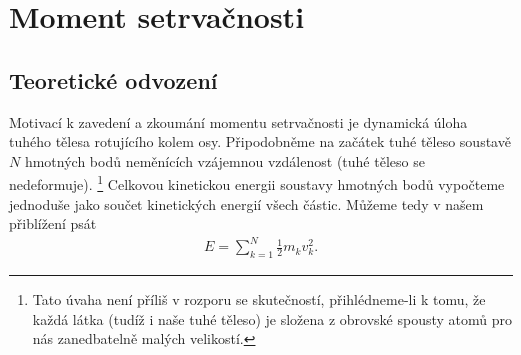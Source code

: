 \documentclass{article}
\begin{document}
	
	\section*{Moment setrvačnosti}
		
		\subsection*{Teoretické odvození}
			
			Motivací k zavedení a zkoumání momentu setrvačnosti je dynamická úloha tuhého tělesa rotujícího kolem osy. Připodobněme na začátek tuhé těleso soustavě $N$ hmotných bodů neměnících vzájemnou vzdálenost (tuhé těleso se nedeformuje).%
				\footnote{Tato úvaha není příliš v rozporu se skutečností, přihlédneme-li k tomu, že každá látka (tudíž i naše tuhé těleso) je složena z obrovské spousty atomů pro nás zanedbatelně malých velikostí.}
			Celkovou kinetickou energii soustavy hmotných bodů vypočteme jednoduše jako součet kinetických energií všech částic. Můžeme tedy v našem přiblížení psát
			\begin{align*}
				E = \sum_{k=1}^{N} \frac 12 m_k v_k^2.
			\end{align*}
			
\end{document}
